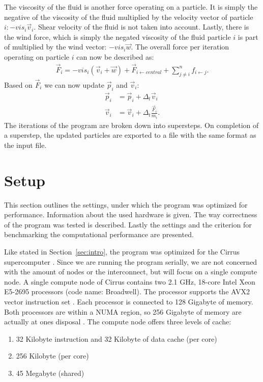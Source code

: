\documentclass[twoside,11pt]{article}
\begin{document}
The viscosity of the fluid is another force operating on a particle.
It is simply the negative of the viscosity of the fluid multiplied
by the velocity vector of particle $i: -vis_i \vec{v}_i$.
Shear velocity of the fluid is not taken into account.
Lastly, there is the wind force, which is simply the negated viscosity
of the fluid particle $i$ is part of multiplied by the wind vector:
$-vis_i \vec{w}$.
The overall force per iteration operating on particle $i$ can now
be described as:
\begin{align}
  \vec{F}_i = -vis_i(\vec{v}_i + \vec{w}) +
              \vec{F}_{i \leftarrow central} +
              \sum_{j\neq i}^n f_{i \leftarrow j}.
\end{align}
Based on $\vec{F}_i$ we can now update $\vec{p}_i$ and $\vec{v}_i$:
\begin{align}
  \vec{p}_i &= \vec{p}_i + \Delta_t \vec{v}_i \\
  \vec{v}_i &= \vec{v}_i + \Delta_t \frac{\vec{F}_i}{m_i}.
\end{align}
The iterations of the program are broken down into supersteps.
On completion of a superstep, the updated particles are exported to a
file with the same format as the input file.


\section{Setup} %
\label{sec:setup}

This section outlines the settings, under which the program was
optimized for performance. Information about the used hardware is
given.
The way correctness of the program was tested is described.
Lastly the settings and the criterion for benchmarking the
computational performance are presented.

Like stated in Section~\ref{sec:intro}, the program was optimized for
the Cirrus supercomputer \citep{cirrus}.
Since we are running the program serially, we are not concerned with
the amount of nodes or the interconnect, but will focus on a single
compute node.
A single compute node of Cirrus contains two 2.1 GHz, 18-core Intel
Xeon E5-2695 processors (code name: Broadwell).
The processor supports the AVX2 vector instruction set \citep{avx2}.
Each processor is connected to 128 Gigabyte of memory.
Both processors are within a NUMA region, so 256 Gigabyte of memory
are actually at ones disposal \citep{cirrus_hardware}.
The compute node offers three levels of cache:
\begin{enumerate}
  \item 32 Kilobyte instruction and 32 Kilobyte of data cache
        (per core)
  \item 256 Kilobyte (per core)
  \item 45 Megabyte (shared)
\end{enumerate}
\end{document}
